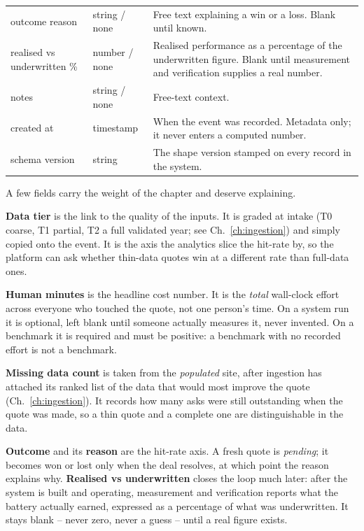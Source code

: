 \begin{table}[H]
\begin{tabularx}{\textwidth}{@{}l l L@{}}
outcome reason & string / none & Free text explaining a win or a loss. Blank until known. \\
realised vs underwritten \% & number / none & Realised performance as a percentage of the underwritten figure. Blank until measurement and verification supplies a real number. \\
notes & string / none & Free-text context. \\
created at & timestamp & When the event was recorded. Metadata only; it never enters a computed number. \\
schema version & string & The shape version stamped on every record in the system. \\
\bottomrule
\end{tabularx}
\end{table}

A few fields carry the weight of the chapter and deserve explaining.

\textbf{Data tier} is the link to the quality of the inputs. It is graded at intake (T0 coarse, T1 partial, T2 a full validated year; see Ch.~\ref{ch:ingestion}) and simply copied onto the event. It is the axis the analytics slice the hit-rate by, so the platform can ask whether thin-data quotes win at a different rate than full-data ones.

\textbf{Human minutes} is the headline cost number. It is the \emph{total} wall-clock effort across everyone who touched the quote, not one person's time. On a system run it is optional, left blank until someone actually measures it, never invented. On a benchmark it is required and must be positive: a benchmark with no recorded effort is not a benchmark.

\textbf{Missing data count} is taken from the \emph{populated} site, after ingestion has attached its ranked list of the data that would most improve the quote (Ch.~\ref{ch:ingestion}). It records how many asks were still outstanding when the quote was made, so a thin quote and a complete one are distinguishable in the data.

\textbf{Outcome} and its \textbf{reason} are the hit-rate axis. A fresh quote is \emph{pending}; it becomes won or lost only when the deal resolves, at which point the reason explains why. \textbf{Realised vs underwritten} closes the loop much later: after the system is built and operating, measurement and verification reports what the battery actually earned, expressed as a percentage of what was underwritten. It stays blank -- never zero, never a guess -- until a real figure exists.

